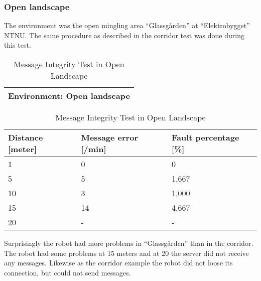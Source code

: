 \newpage
\subsubsection{Open landscape}
The environment was the open mingling area ``Glassgården'' at ``Elektrobygget'' NTNU. 
The same procedure as described in the corridor test was done during this test.

\begin{table}[ht]
\begin{center}
 \begin{tabular}{|l|} 
 \hline
 Environment: \textbf{Open landscape}\\
 \hline
 \end{tabular}
 \begin{tabular}{|l|l|l|}
 \hline
 Distance [meter] & Message error [/min] &  Fault percentage [\%]\\
 \hline
 1		        &   0 		&	0    \\
 5              &   5  		&	1,667\\
 10             &   3  		&	1,000\\
 15				&	14 		&	4,667\\
 20				&	-  		&	-	\\
 \hline
\end{tabular}
\end{center}
\caption{Message Integrity Test in Open Landscape}
\label{tab:messintegrityopen}
\end{table}

Surprisingly the robot had more problems in ``Glassgården'' than in the corridor. The robot had some problems at 15 meters and at 20 the server did not receive any messages. Likewise as the corridor example the robot did not loose its connection, but could not send messages.{\color{blue}{The conclusion is that a robot should never be further apart than 15 meters from the server dongle.}}